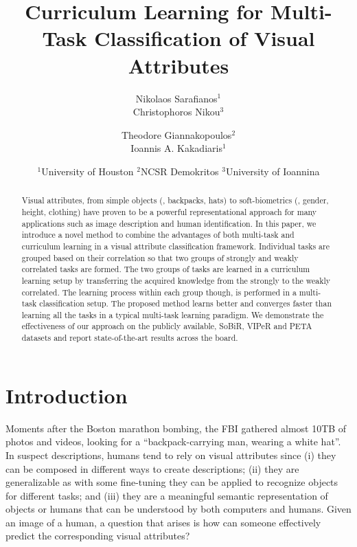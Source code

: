 \documentclass[10pt,twocolumn,letterpaper]{article}
\begin{document}
\title{Curriculum Learning for Multi-Task Classification of Visual Attributes}

	\author{Nikolaos Sarafianos$^{1}$ \\
		Christophoros Nikou$^{3}$
		\and
		Theodore Giannakopoulos$^{2}$\\
		Ioannis A. Kakadiaris$^{1}$
		\and		
	$^{1}$University of Houston \quad $^{2}$NCSR Demokritos \quad $^{3}$University of Ioannina
	}
	
	\maketitle   
\thispagestyle{empty}


\begin{abstract}
   	Visual attributes, from simple objects (\eg, backpacks, hats) to soft-biometrics (\eg, gender, height, clothing) have proven to be a powerful representational approach for many applications such as image description and human identification. In this paper, we introduce a novel method to combine the advantages of both multi-task and curriculum learning in a visual attribute classification framework. Individual tasks are grouped based on their correlation so that two groups of strongly and weakly correlated tasks are formed. The two groups of tasks are learned in a curriculum learning setup by transferring the acquired knowledge from the strongly to the weakly correlated. The learning process within each group though, is performed in a multi-task classification setup. The proposed method learns better and converges faster than learning all the tasks in a typical multi-task learning paradigm. We demonstrate the effectiveness of our approach on the publicly available, SoBiR, VIPeR and PETA datasets and report state-of-the-art results across the board. 
\end{abstract}
\section{Introduction}
	Moments after the Boston marathon bombing, the FBI gathered almost 10TB of photos and videos, looking for a ``backpack-carrying man, wearing a white hat''. In suspect descriptions, humans tend to rely on visual attributes since (i) they can be composed in different ways to create descriptions; (ii) they are generalizable as with some fine-tuning they can be applied to recognize objects for different tasks; and (iii) they are a meaningful semantic representation of objects or humans that can be understood by both computers and humans. Given an image of a human, a question that arises is how can someone effectively predict the corresponding visual attributes? 
	
\end{document}
